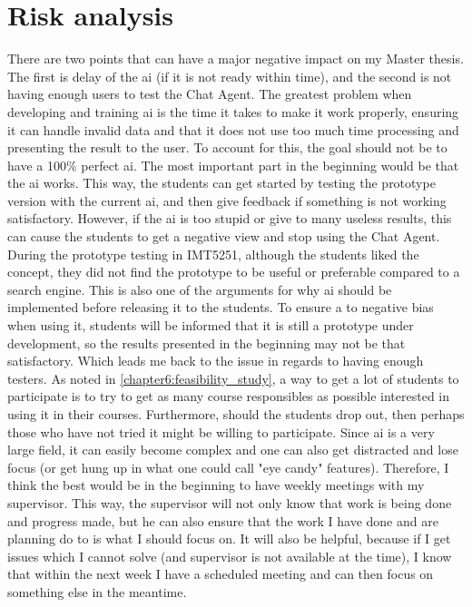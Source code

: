 \chapter{Risk analysis}
\label{chapter7:risk_analysis}
There are two points that can have a major negative impact on my Master thesis. The first is delay of the \gls{ai} (if it is not ready within time), and the 
second is not having enough users to test the Chat Agent. The greatest problem when developing and training \gls{ai} is the time it takes to make it work 
properly, ensuring it can handle invalid data and that it does not use too much time processing and presenting the result to the user. To account for this, 
the goal should not be to have a 100\% perfect \gls{ai}. The most important part in the beginning would be that the \gls{ai} works. This way, the students 
can get started by testing the prototype version with the current \gls{ai}, and then give feedback if something is not working satisfactory. However, if the 
\gls{ai} is too stupid or give to many useless results, this can cause the students to get a negative view and stop using the Chat Agent. 
\vspace{0.5em}\newline
During the prototype testing in IMT5251, although the students liked the concept, they did not find the prototype to be useful or preferable compared to a search engine. 
This is also one of the arguments for why \gls{ai} should be implemented before releasing it to the students. To ensure a to negative bias when using it, 
students will be informed that it is still a prototype under development, so the results presented in the beginning may not be that satisfactory. Which leads 
me back to the issue in regards to having enough testers. As noted in \ref{chapter6:feasibility_study}, a way to get a lot of students to participate is to 
try to get as many course responsibles as possible interested in using it in their courses. Furthermore, should the students drop out, then perhaps those who  
have not tried it might be willing to participate.
\vspace{0.5em}\newline
Since \gls{ai} is a very large field, it can easily become complex and one can also get distracted and lose focus (or get hung up in what one could call "eye candy" 
features). Therefore, I think the best would be in the beginning to have weekly meetings with my supervisor. This way, the supervisor will not only know that work is being done
and progress made, but he can also ensure that the work I have done and are planning do to is what I should focus on. It will also be helpful, because if I get issues which 
I cannot solve (and supervisor is not available at the time), I know that within the next week I have a scheduled meeting and can then focus on something else in the meantime.



